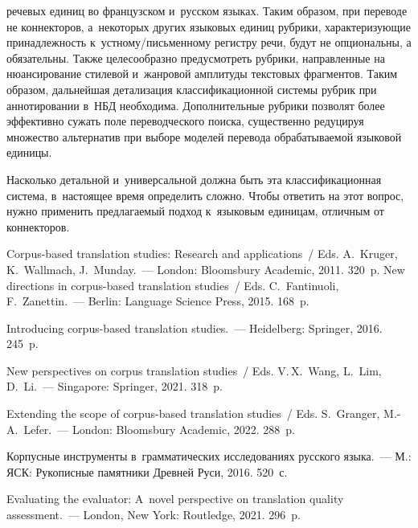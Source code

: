 \begin{multicols}{2}
\begin{enumerate}[1.]
речевых единиц во французском и~русском языках. Таким образом, при переводе не 
коннекторов, а~некоторых других языковых единиц рубрики, 
характеризующие принадлежность к~устному/письменному регистру речи, 
будут не опциональны, а обязательны. Также целесообразно предусмотреть 
рубрики, на\-прав\-лен\-ные на нюансирование стилевой и~жанровой амплитуды 
текстовых фрагментов. Таким образом,  дальнейшая детализация 
классификационной системы рубрик при аннотировании в~НБД необходима. 
Дополнительные рубрики позволят более эффективно сужать поле 
переводческого поиска, существенно редуцируя множество альтернатив при 
выборе моделей перевода обрабатываемой языковой единицы.
\end{enumerate}

  Насколько детальной и~универсальной должна быть эта 
классификационная система, в~настоящее время определить сложно. Чтобы 
ответить на этот вопрос, нужно применить предлагаемый подход к~языковым 
единицам, отличным от коннекторов.

\vspace*{-9pt}

{\small\frenchspacing
 {%
 \begin{thebibliography}{99}
 
 \vspace*{-3pt}
 
Corpus-based translation studies: Research and applications~/ Eds. A.~Kruger, K.~Wallmach, 
J.~Munday.~--- London: Bloomsbury Academic, 2011. 320~p.
New directions in corpus-based translation studies~/ Eds. C.~Fantinuoli, F.~Zanettin.~--- Berlin: 
Language Science Press, 2015. 168~p.

 Introducing corpus-based translation studies.~--- Heidelberg: Springer, 2016. 
245~p.

New perspectives on corpus translation studies~/ Eds. V.\,X.~Wang, L.~Lim, D.~Li.~--- Singapore: Springer, 2021. 318~p.

Extending the scope of corpus-based translation studies~/ Eds. S.~Granger, M.-A.~Lefer.~--- 
London: Bloomsbury Academic, 2022. 288~p.

 Корпусные инструменты в~грамматических исследованиях 
русского языка.~--- М.: ЯСК: Рукописные памятники Древней Руси, 2016. 520~с.

 Evaluating the evaluator: A~novel perspective on translation quality 
assessment.~--- London, New York: Routledge, 2021. 296~p.


\end{thebibliography}}}
\end{multicols}
